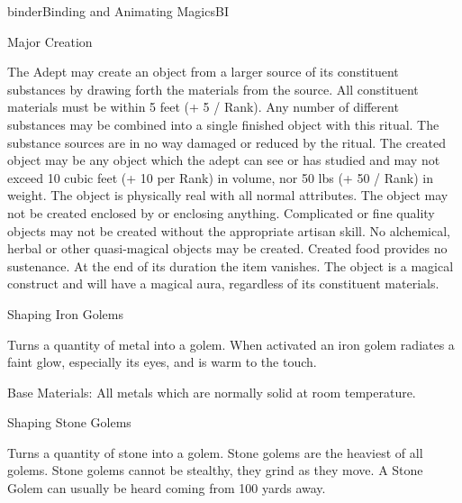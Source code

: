 \begin{college}[1.1]{binder}{Binding and Animating Magics}{BI}
\begin{ritual}[R-4]{Major Creation}

\begin{effects}
The Adept may create an object from a larger source of its constituent
substances by drawing forth the materials from the source.  All
constituent materials must be within 5 feet (+ 5 / Rank).  Any number
of different substances may be combined into a single finished object
with this ritual. The substance sources are in no way damaged or
reduced by the ritual. The created object may be any object which the
adept can see or has studied and may not exceed 10 cubic feet (+ 10
per Rank) in volume, nor 50 lbs (+ 50 / Rank) in weight. The object is
physically real with all normal attributes. The object may not be
created enclosed by or enclosing anything. Complicated or fine quality
objects may not be created without the appropriate artisan skill. No
alchemical, herbal or other quasi-magical objects may be
created. Created food provides no sustenance.  At the end of its
duration the item vanishes.  The object is a magical construct and
will have a magical aura, regardless of its constituent materials.
\end{effects}
\end{ritual}

\begin{ritual}[R-5]{Shaping Iron Golems}

\begin{effects}
Turns a quantity of metal into a golem.  When activated an iron golem
radiates a faint glow, especially its eyes, and is warm to the touch.

Base Materials: All metals which are normally solid at room
temperature.
\end{effects}
\end{ritual}

\begin{ritual}[R-6]{Shaping Stone Golems}

\materialcost{500 sp}
\begin{effects}
Turns a quantity of stone into a golem.  Stone golems are the heaviest
of all golems.  Stone golems cannot be stealthy, they grind as they
move.  A Stone Golem can usually be heard coming from 100 yards away.


\end{effects}
\end{ritual}
\end{college}
